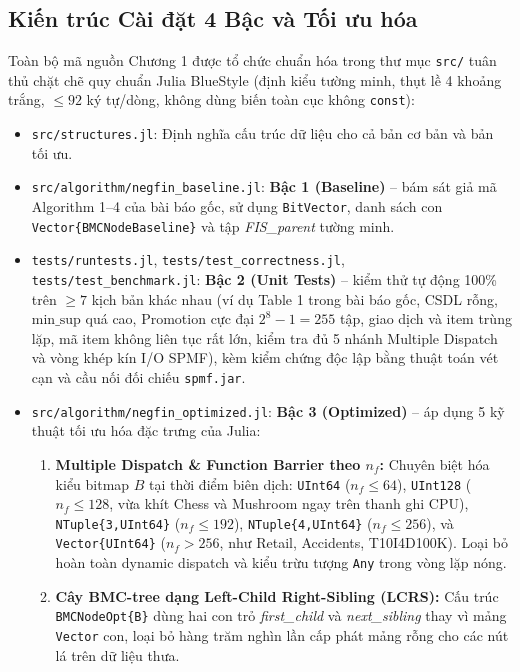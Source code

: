 \documentclass[conference]{IEEEtran}
\begin{document}
\subsection{Kiến trúc Cài đặt 4 Bậc và Tối ưu hóa}
Toàn bộ mã nguồn Chương 1 được tổ chức chuẩn hóa trong thư mục \texttt{src/} tuân thủ chặt chẽ quy chuẩn Julia BlueStyle (định kiểu tường minh, thụt lề 4 khoảng trắng, $\le 92$ ký tự/dòng, không dùng biến toàn cục không \texttt{const}):
\begin{itemize}
    \item \texttt{src/structures.jl}: Định nghĩa cấu trúc dữ liệu cho cả bản cơ bản và bản tối ưu.
    \item \texttt{src/algorithm/negfin\_baseline.jl}: \textbf{Bậc 1 (Baseline)} -- bám sát giả mã Algorithm 1--4 của bài báo gốc, sử dụng \texttt{BitVector}, danh sách con \texttt{Vector\{BMCNodeBaseline\}} và tập \textit{FIS\_parent} tường minh.
    \item \texttt{tests/runtests.jl}, \texttt{tests/test\_correctness.jl}, \texttt{tests/test\_benchmark.jl}: \textbf{Bậc 2 (Unit Tests)} -- kiểm thử tự động 100\% trên $\ge 7$ kịch bản khác nhau (ví dụ Table 1 trong bài báo gốc, CSDL rỗng, $\text{min\_sup}$ quá cao, Promotion cực đại $2^8 - 1 = 255$ tập, giao dịch và item trùng lặp, mã item không liên tục rất lớn, kiểm tra đủ 5 nhánh Multiple Dispatch và vòng khép kín I/O SPMF), kèm kiểm chứng độc lập bằng thuật toán vét cạn và cầu nối đối chiếu \texttt{spmf.jar}.
    \item \texttt{src/algorithm/negfin\_optimized.jl}: \textbf{Bậc 3 (Optimized)} -- áp dụng 5 kỹ thuật tối ưu hóa đặc trưng của Julia:
    \begin{enumerate}
        \item \textbf{Multiple Dispatch \& Function Barrier theo $n_f$:} Chuyên biệt hóa kiểu bitmap $B$ tại thời điểm biên dịch: \texttt{UInt64} ($n_f \le 64$), \texttt{UInt128} ($n_f \le 128$, vừa khít Chess và Mushroom ngay trên thanh ghi CPU), \texttt{NTuple\{3,UInt64\}} ($n_f \le 192$), \texttt{NTuple\{4,UInt64\}} ($n_f \le 256$), và \texttt{Vector\{UInt64\}} ($n_f > 256$, như Retail, Accidents, T10I4D100K). Loại bỏ hoàn toàn dynamic dispatch và kiểu trừu tượng \texttt{Any} trong vòng lặp nóng.
        \item \textbf{Cây BMC-tree dạng Left-Child Right-Sibling (LCRS):} Cấu trúc \texttt{BMCNodeOpt\{B\}} dùng hai con trỏ \textit{first\_child} và \textit{next\_sibling} thay vì mảng \texttt{Vector} con, loại bỏ hàng trăm nghìn lần cấp phát mảng rỗng cho các nút lá trên dữ liệu thưa.

\end{enumerate}
\end{itemize}
\end{document}
